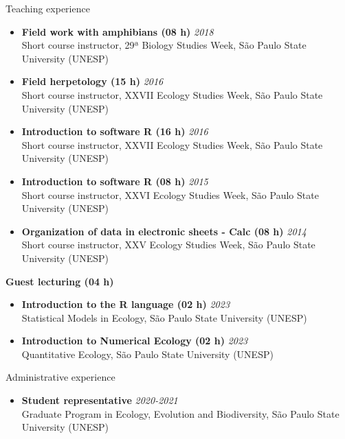 \documentclass{resume}
\begin{document}
\begin{rSection}{Teaching experience}
\begin{itemize}
\item {\bf Field work with amphibians (08 h)} \hfill{\em 2018} 
\\ Short course instructor, 29ª Biology Studies Week, São Paulo State University (UNESP) 

\item {\bf Field herpetology (15 h)} \hfill{\em 2016} 
\\ Short course instructor, XXVII Ecology Studies Week, São Paulo State University (UNESP) 

\item {\bf Introduction to software R (16 h)} \hfill{\em 2016} 
\\ Short course instructor, XXVII Ecology Studies Week, São Paulo State University (UNESP) 

\item {\bf Introduction to software R (08 h)} \hfill{\em 2015} 
\\ Short course instructor, XXVI Ecology Studies Week, São Paulo State University (UNESP) 

\item {\bf Organization of data in electronic sheets - Calc (08 h)} \hfill{\em 2014} 
\\ Short course instructor, XXV Ecology Studies Week, São Paulo State University (UNESP) 
\end{itemize}

{\bf Guest lecturing (04 h)}
\begin{itemize}
\item {\bf Introduction to the R language (02 h)} \hfill{\em 2023} 
\\ Statistical Models in Ecology, São Paulo State University (UNESP) 

\item {\bf Introduction to Numerical Ecology (02 h)} \hfill{\em 2023} 
\\ Quantitative Ecology, São Paulo State University (UNESP) 
\end{itemize}
\end{rSection}


\begin{rSection}{Administrative experience}
\begin{itemize}
\item {\bf Student representative} \hfill{\em 2020-2021} \\ 
Graduate Program in Ecology, Evolution and Biodiversity, São Paulo State University (UNESP)
\end{itemize}
\end{rSection}
\end{document}
